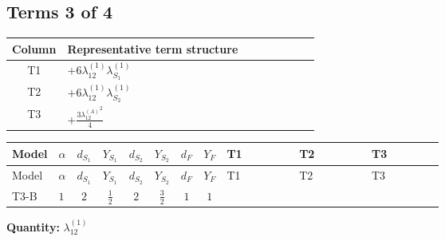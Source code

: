 \documentclass[8pt]{article}
\begin{document}
\begin{landscape}
\subsection*{Terms 3 of 4}
\begin{center}
\begin{tabular}{@{}c >{\raggedright\arraybackslash}p{0.82\linewidth}@{}}
\toprule
Column & Representative term structure \\
\midrule
T1 & \(\displaystyle +6 {\lambda_{12}^{(1)}} {\lambda_{S_1}^{(1)}}\) \\
\midrule
T2 & \(\displaystyle +6 {\lambda_{12}^{(1)}} {\lambda_{S_2}^{(1)}}\) \\
\midrule
T3 & \(\displaystyle +\frac{3 {\lambda_{12}^{(A)}}^2}{4}\) \\
\midrule
\bottomrule
\end{tabular}
\end{center}
\smallskip
\tiny
\begin{longtable}{@{}llcccccc >{\raggedright\arraybackslash}p{0.21\linewidth} >{\raggedright\arraybackslash}p{0.21\linewidth} >{\raggedright\arraybackslash}p{0.21\linewidth}@{}}
\toprule
Model & $\alpha$ & $d_{S_1}$ & $Y_{S_1}$ & $d_{S_2}$ & $Y_{S_2}$ & $d_F$ & $Y_F$ & T1 & T2 & T3 \\
\midrule
\endfirsthead
\toprule
Model & $\alpha$ & $d_{S_1}$ & $Y_{S_1}$ & $d_{S_2}$ & $Y_{S_2}$ & $d_F$ & $Y_F$ & T1 & T2 & T3 \\
\midrule
\endhead
T3-B & $1$ & $2$ & $\frac{1}{2}$ & $2$ & $\frac{3}{2}$ & $1$ & $1$ & \scriptsize\adjustbox{max width=\linewidth}{$\begin{gathered} +6 {\lambda_{12}^{(1)}} {\lambda_{S_1}^{(1)}}\end{gathered}$} & \scriptsize\adjustbox{max width=\linewidth}{$\begin{gathered} +6 {\lambda_{12}^{(1)}} {\lambda_{S_2}^{(1)}}\end{gathered}$} & \scriptsize\adjustbox{max width=\linewidth}{$\begin{gathered} +\frac{3 {\lambda_{12}^{(A)}}^2}{4}\end{gathered}$} \\
\midrule
\bottomrule
\end{longtable}
\clearpage
\noindent\textbf{Quantity: }$\lambda_{12}^{(1)}$\par\smallskip

\end{landscape}
\end{document}
